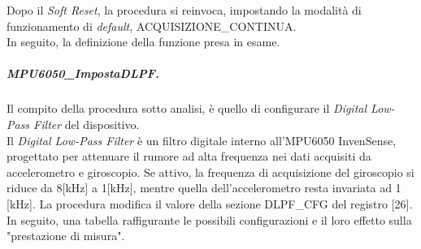 \documentclass[11pt]{report}
\begin{document}
Dopo il \textit{Soft Reset}, la procedura si reinvoca, impostando la modalità di funzionamento di \textit{default}, ACQUISIZIONE\_CONTINUA.\\
In seguito, la definizione della funzione presa in esame.

\subparagraph{MPU6050\_ImpostaDLPF.} 
Il compito della procedura sotto analisi, è quello di configurare il \textit{Digital Low-Pass Filter} del dispositivo.\\
Il \textit{Digital Low-Pass Filter} è un filtro digitale interno all'MPU6050 InvenSense, progettato per attenuare il rumore ad alta frequenza nei dati acquisiti da accelerometro e giroscopio.
Se attivo, la frequenza di acquisizione del giroscopio si riduce da 8[kHz] a 1[kHz], mentre quella dell'accelerometro resta invariata ad 1 [kHz].
La procedura modifica il valore della sezione DLPF\_CFG del registro [26]. In seguito, una tabella raffigurante le possibili configurazioni e il loro effetto sulla "prestazione di misura".
\begin{table}[H]
    \centering
    \caption{Le possibili configurazioni opzionabili del \textit{Digital Low-Pass Filter}.}
    \label{tab: tabella}
\end{table}

\end{document}
